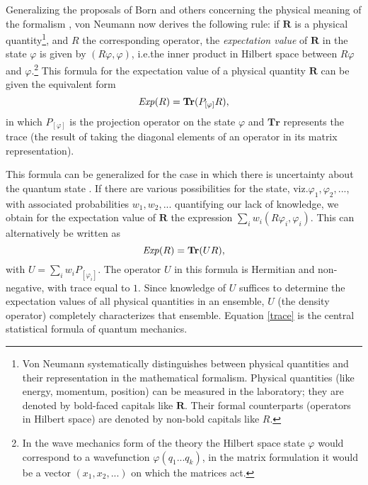 \documentclass[12pt]{article}
\begin{document}
Generalizing the proposals of Born and others concerning the physical meaning of the formalism \cite[III.1]{VN1}, von Neumann now derives the following rule: if $\textbf{R}$ is a physical quantity\footnote{Von Neumann systematically distinguishes between physical quantities and their representation in the mathematical formalism. Physical quantities (like energy, momentum, position) can be measured in the laboratory; they are denoted by bold-faced capitals like $\textbf{R}$. Their formal counterparts (operators in Hilbert space) are denoted by non-bold capitals like $R$.}, and $R$ the corresponding operator, the \emph{expectation value} of $\textbf{R}$ in the state $\varphi$ is given by $(R\varphi, \varphi)$, i.e.\@ the inner product in Hilbert space between $R\varphi$ and $\varphi$.\footnote{In the wave mechanics form of the theory the Hilbert space state $\varphi$ would correspond to a wavefunction $\varphi(q_1...q_k)$, in the matrix formulation it would be a vector $(x_1, x_2,...)$ on which the matrices act.} This formula for the expectation value of a physical quantity $\textbf{R}$ can be given the equivalent form
\begin{equation*}
  {\it Exp}(R) = \textbf{Tr}(P_{[\varphi]}R),
\end{equation*}
in which $P_{[\varphi]}$ is the projection operator on the state $\varphi$ and $\textbf{Tr}$ represents the trace (the result of taking the diagonal elements of an operator in its matrix representation).

This formula can be generalized for the case in which there is uncertainty about the quantum state \cite[pp.\@ 157--158]{VN1}. If there are various possibilities for the state, viz.\@ $\varphi_1, \varphi_2, ...$, with associated probabilities $w_1, w_2, ...$ quantifying our lack of knowledge, we obtain for the expectation value of $\textbf{R}$ the expression $\sum_i w_i (R\varphi_i, \varphi_i)$. This can alternatively be written as
\begin{equation}\label{trace}
 {\it Exp}(R) = \textbf{Tr} (U R),
\end{equation}
with $ U = \sum_i w_i P_{[\varphi_i]}$. The operator $U$ in this formula is Hermitian and non-negative, with trace equal to $1$. Since knowledge of $U$ suffices to determine the expectation values of all physical quantities in an ensemble, $U$ (the density operator) completely characterizes that ensemble. Equation \ref{trace} is the central statistical formula of quantum mechanics.
\end{document}

